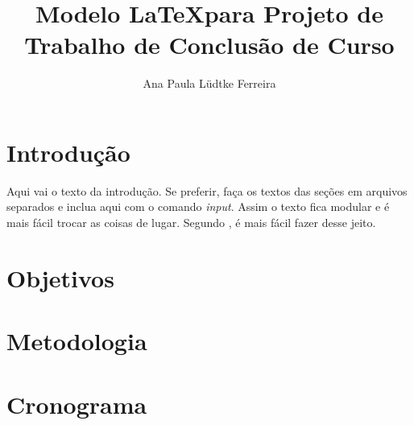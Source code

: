 \documentclass{article}
\author{Ana Paula Lüdtke Ferreira}
\title{Modelo \LaTeX para Projeto de Trabalho de Conclusão de Curso}
\begin{document}
\maketitle

\section{Introdução}
\label{sec-introducao}

Aqui vai o texto da introdução. Se preferir, faça os textos das seções em arquivos separados e inclua aqui com o comando \emph{input}. Assim o texto fica modular e é mais fácil trocar as coisas de lugar. Segundo \cite{lamport94latex}, é mais fácil fazer desse jeito.

\section{Objetivos}
\label{sec-objetivos}

\section{Metodologia}
\label{sec-metodologia}

\section{Cronograma}
\label{sec-cronograma}




\end{document}
